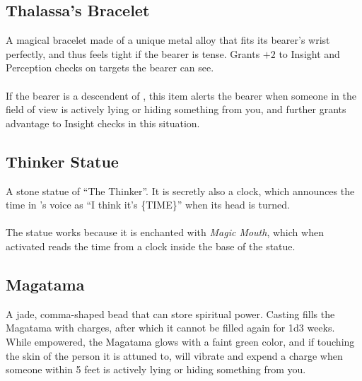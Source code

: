 \subsection{Thalassa's Bracelet}
\label{items:bracelet}
A magical bracelet made of a unique metal alloy that fits its bearer's wrist perfectly, and thus feels tight if the bearer is tense. Grants $+2$ to Insight and Perception checks on targets the bearer can see.\\
\\
If the bearer is a descendent of , this item alerts the bearer when someone in the field of view is actively lying or hiding something from you, and further grants advantage to Insight checks in this situation.

\subsection{Thinker Statue}
\label{items:thinker}
A stone statue of ``The Thinker''. It is secretly also a clock, which announces the time in 's voice as ``I think it's \{TIME\}'' when its head is turned. \\
\\
The statue works because it is enchanted with \textit{Magic Mouth}, which when activated reads the time from a clock inside the base of the statue.

\subsection{Magatama}
\label{items:magatama}
A jade, comma-shaped bead that can store spiritual power. Casting  fills the Magatama with charges, after which it cannot be filled again for 1d3 weeks. While empowered, the Magatama glows with a faint green color, and if touching the skin of the person it is attuned to, will vibrate and expend a charge when someone within 5 feet is actively lying or hiding something from you.